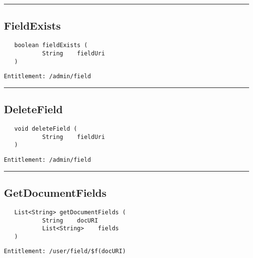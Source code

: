 \rule{12cm}{2pt}
\subsection{FieldExists}
\label{Api:FieldExists}
\begin{verbatim}
   boolean fieldExists (
           String    fieldUri
   )
\end{verbatim}
\begin{Verbatim}[fontsize=\small, formatcom=\color{Maroon}]
  Entitlement: /admin/field
\end{Verbatim}



\rule{12cm}{2pt}
\subsection{DeleteField}
\label{Api:DeleteField}
\begin{verbatim}
   void deleteField (
           String    fieldUri
   )
\end{verbatim}
\begin{Verbatim}[fontsize=\small, formatcom=\color{Maroon}]
  Entitlement: /admin/field
\end{Verbatim}



\rule{12cm}{2pt}
\subsection{GetDocumentFields}
\label{Api:GetDocumentFields}
\begin{verbatim}
   List<String> getDocumentFields (
           String    docURI
           List<String>    fields
   )
\end{verbatim}
\begin{Verbatim}[fontsize=\small, formatcom=\color{Maroon}]
  Entitlement: /user/field/$f(docURI)
\end{Verbatim}




